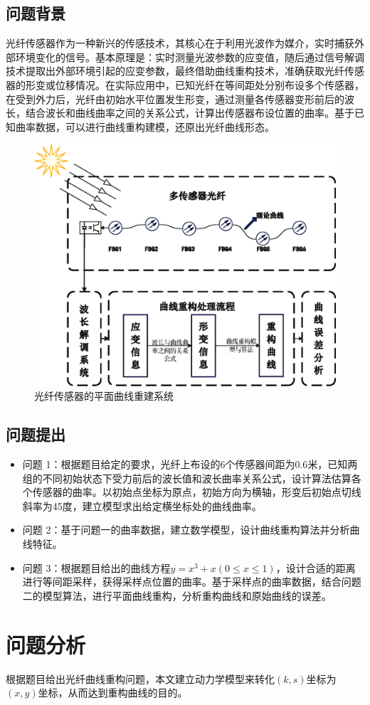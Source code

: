 \documentclass[withoutpreface,bwprint]{cumcmthesis}
\begin{document}
\subsection{问题背景}
光纤传感器作为一种新兴的传感技术，其核心在于利用光波作为媒介，实时捕获外部环境变化的信号。基本原理是：实时测量光波参数的应变值，随后通过信号解调技术提取出外部环境引起的应变参数，最终借助曲线重构技术，准确获取光纤传感器的形变或位移情况。在实际应用中，已知光纤在等间距处分别布设多个传感器，在受到外力后，光纤由初始水平位置发生形变，通过测量各传感器变形前后的波长，结合波长和曲线曲率之间的关系公式，计算出传感器布设位置的曲率。基于已知曲率数据，可以进行曲线重构建模，还原出光纤曲线形态。
\begin{figure}[!h]
\centering
\includegraphics[width=.6\textwidth]{1.eps}
\caption{光纤传感器的平面曲线重建系统}
\end{figure}
\subsection{问题提出}
\begin{itemize}
\item 问题 1：根据题目给定的要求，光纤上布设的$6$个传感器间距为$0.6$米，已知两组的不同初始状态下受力前后的波长值和波长曲率关系公式，设计算法估算各个传感器的曲率。以初始点坐标为原点，初始方向为横轴，形变后初始点切线斜率为45度，建立模型求出给定横坐标处的曲线曲率。
\item 问题 2：基于问题一的曲率数据，建立数学模型，设计曲线重构算法并分析曲线特征。
\item 问题 3：根据题目给出的曲线方程$y=x^3+x(0 \leq x \leq 1)$，设计合适的距离进行等间距采样，获得采样点位置的曲率。基于采样点的曲率数据，结合问题二的模型算法，进行平面曲线重构，分析重构曲线和原始曲线的误差。
\end{itemize}


\section{问题分析}
根据题目给出光纤曲线重构问题，本文建立动力学模型来转化$(k,s)$坐标为$(x,y)$坐标，从而达到重构曲线的目的。
\end{document}
